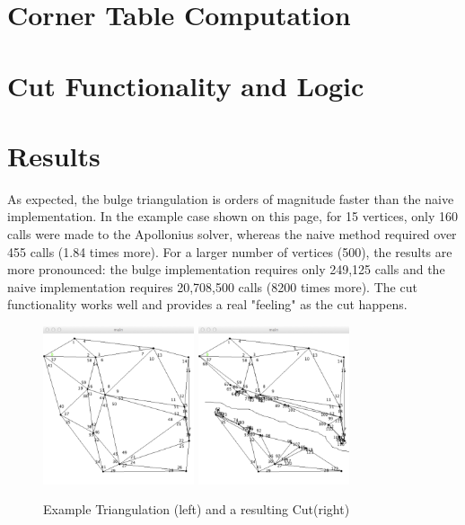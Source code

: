 \documentclass[letterpaper,10pt]{IEEEtran}
\begin{document}
\section{Corner Table Computation}

\section{Cut Functionality and Logic}



\section{Results}
As expected, the bulge triangulation is orders of magnitude faster than the naive implementation.  In the example case shown on this page, for 15 vertices, only 160 calls were made to the Apollonius solver, whereas the naive method required over 455 calls (1.84 times more).  For a larger number of vertices (500), the results are more pronounced: the bulge implementation requires only 249,125 calls and the naive implementation requires 20,708,500 calls (8200 times more).  
The cut functionality works well and provides a real "feeling" as the cut happens. 
\begin{figure}[!t]
\centering
\includegraphics[width=1.75in]{main/data/triangulation}
\includegraphics[width=1.75in]{main/data/cut}
\caption{Example Triangulation (left) and a resulting Cut(right)}
\label{fig_triangulation}
\end{figure}
\end{document}
